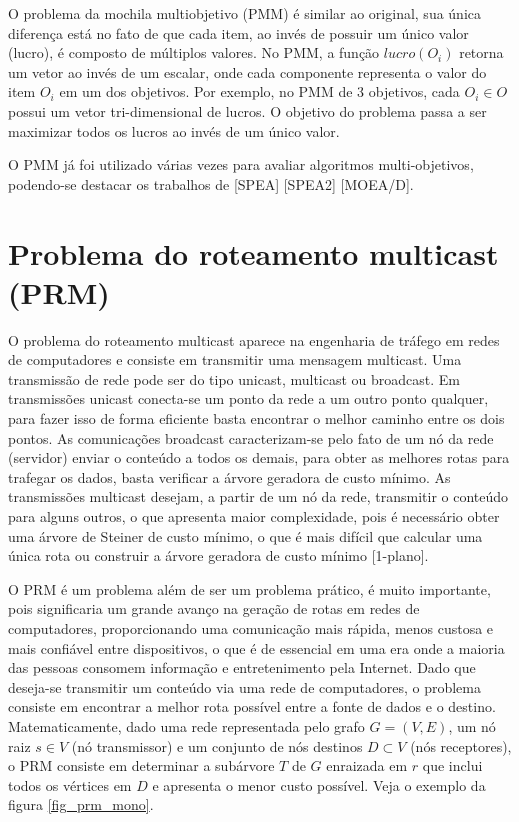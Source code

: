 O problema da mochila multiobjetivo (PMM) é similar ao original, sua única diferença está no fato de que cada item, ao invés de possuir um único valor (lucro), é composto de múltiplos valores. No PMM, a função $lucro(O_i)$ retorna um vetor ao invés de um escalar, onde cada componente representa o valor do item $O_i$ em um dos objetivos. Por exemplo, no PMM de 3 objetivos, cada $O_i \in O$ possui um vetor tri-dimensional de lucros. O objetivo do problema passa a ser maximizar todos os lucros ao invés de um único valor.

O PMM já foi utilizado várias vezes para avaliar algoritmos multi-objetivos, podendo-se destacar os trabalhos de [SPEA] [SPEA2] [MOEA/D].

\section{Problema do roteamento multicast (PRM)}

O problema do roteamento multicast aparece na engenharia de tráfego em redes de computadores e consiste em transmitir uma mensagem multicast. Uma transmissão de rede pode ser do tipo unicast, multicast ou broadcast. Em transmissões unicast conecta-se um ponto da rede a um outro ponto qualquer, para fazer isso de forma eficiente basta encontrar o melhor caminho entre os dois pontos. As comunicações broadcast caracterizam-se pelo fato de um nó da rede (servidor) enviar o conteúdo a todos os demais, para obter as melhores rotas para trafegar os dados, basta verificar a árvore geradora de custo mínimo. As transmissões multicast desejam, a partir de um nó da rede, transmitir o conteúdo para alguns outros, o que apresenta maior complexidade, pois é necessário obter uma árvore de Steiner de custo mínimo, o que é mais difícil que calcular uma única rota ou construir a árvore geradora de custo mínimo [1-plano].

O PRM é um problema além de ser um problema prático, é muito importante, pois significaria um grande avanço na geração de rotas em redes de computadores, proporcionando uma comunicação mais rápida, menos custosa e mais confiável entre dispositivos, o que é de essencial em uma era onde a maioria das pessoas consomem informação e entretenimento pela Internet. Dado que deseja-se transmitir um conteúdo via uma rede de computadores, o problema consiste em encontrar a melhor rota possível entre a fonte de dados e o destino. Matematicamente, dado uma rede representada pelo grafo $G=(V,E)$, um nó raiz $s \in V$ (nó transmissor) e um conjunto de nós destinos $D \subset V$ (nós receptores), o PRM consiste em determinar a subárvore $T$ de $G$ enraizada em $r$ que inclui todos os vértices em $D$ e apresenta o menor custo possível. Veja o exemplo da figura \ref{fig_prm_mono}.

